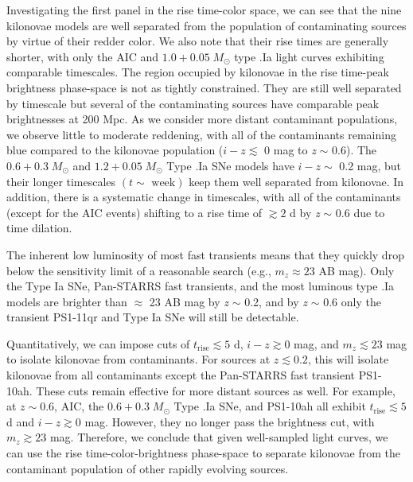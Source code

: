\clearpage
Investigating the first panel in the rise time-color space, we can see that the nine kilonovae models are well separated from the population of contaminating sources by virtue of their redder color. We also note that their rise times are generally shorter, with only the AIC and $1.0+0.05\;M_{\odot}$ type .Ia light curves exhibiting comparable timescales. The region occupied by kilonovae in the rise time-peak brightness phase-space is not as tightly constrained. They are still well separated by timescale but several of the contaminating sources have comparable peak brightnesses at 200 Mpc. As we consider more distant contaminant populations, we observe little to moderate reddening, with all of the contaminants remaining blue compared to the kilonovae population ($i-z\lesssim$ 0 mag to {\em z} $\sim$ 0.6). The $0.6+0.3\;M_{\odot}$ and $1.2+0.05\;M_{\odot}$ Type .Ia SNe models have $i-z\sim$ 0.2 mag, but their longer timescales $(t\sim\text{ week})$ keep them well separated from kilonovae. In addition, there is a systematic change in timescales, with all of the contaminants (except for the AIC events) shifting to a rise time of $\gtrsim  2$ d by {\em z} $\sim$ 0.6 due to time dilation. 

The inherent low luminosity of most fast transients means that they quickly drop below the sensitivity limit of a reasonable search (e.g., $m_z \approx 23$ AB mag). Only the Type Ia SNe, Pan-STARRS fast transients, and the most luminous type .Ia models are brighter than $\approx$ 23 AB mag by {\em z} $\sim$ 0.2, and by {\em z} $\sim$ 0.6 only the transient PS1-11qr and Type Ia SNe will still be detectable. 

Quantitatively, we can impose cuts of $t_{\text{rise}} \lesssim  5$ d, $i-z \gtrsim 0$ mag, and $m_z \lesssim 23$ mag to isolate kilonovae from contaminants. For sources at $z \lesssim 0.2$, this will isolate kilonovae from all contaminants except the Pan-STARRS fast transient PS1-10ah. These cuts remain effective for more distant sources as well. For example, at $z\sim0.6$, AIC, the $0.6+0.3\;M_{\odot}$ Type .Ia SNe, and PS1-10ah all exhibit $t_{\text{rise}} \lesssim  5$ d and $i-z \gtrsim 0$ mag. However, they no longer pass the brightness cut, with $m_z \gtrsim 23$ mag. Therefore, we conclude that given well-sampled light curves, we can use the rise time-color-brightness phase-space to separate kilonovae from the contaminant population of other rapidly evolving sources.
 
